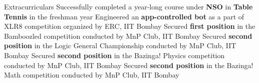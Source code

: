 \begin{rubric}{Extracurriculars}
	\entry*[2019] Successfully completed a year-long course under \textbf{NSO} in \textbf{Table Tennis} in the freshman year
	\entry*[2019\phantom{}] Engineered an \textbf{app-controlled bot} as a part of XLR8 competition organized by ERC, IIT Bombay
	\entry*[2020] Secured \textbf{first position} in the Bamboozled competition conducted by MnP Club, IIT Bombay
	\entry*[2019] Secured \textbf{second position} in the Logic General Championship conducted by MnP Club, IIT Bombay
	\entry*[2019] Secured \textbf{second position} in the Bazinga! Physics competition conducted by MnP Club, IIT Bombay
	\entry*[2021] Secured \textbf{second position} in the Bazinga! Math competition conducted by MnP Club, IIT Bombay
\end{rubric}